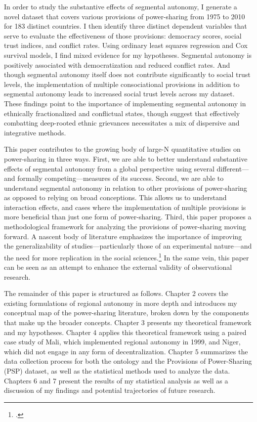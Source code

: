 \documentclass[12pt]{article}
\begin{document}
In order to study the substantive effects of segmental autonomy, I generate a novel dataset that covers various provisions of power-sharing from 1975 to 2010 for 183 distinct countries. I then identify three distinct dependent variables that serve to evaluate the effectiveness of those provisions: democracy scores, social trust indices, and conflict rates. Using ordinary least squares regression and Cox survival models, I find mixed evidence for my hypotheses. Segmental autonomy is positively associated with democratization and reduced conflict rates. And though segmental autonomy itself does not contribute significantly to social trust levels, the implementation of multiple consociational provisions in addition to segmental autonomy leads to increased social trust levels across my dataset. These findings point to the importance of implementing segmental autonomy in ethnically fractionalized and conflictual states, though suggest that effectively combatting deep-rooted ethnic grievances necessitates a mix of dispersive and integrative methods.
 
This paper contributes to the growing body of large-N quantitative studies on power-sharing in three ways. First, we are able to better understand substantive effects of segmental autonomy from a global perspective using several different---and formally competing---measures of its success. Second, we are able to understand segmental autonomy in relation to other provisions of power-sharing as opposed to relying on broad conceptions. This allows us to understand interaction effects, and cases where the implementation of multiple provisions is more beneficial than just one form of power-sharing. Third, this paper proposes a methodological framework for analyzing the provisions of power-sharing moving forward. A nascent body of literature emphasizes the importance of improving the generalizability of studies---particularly those of an experimental nature---and the need for more replication in the social sciences.\footcite{dunning_information_2020, dunning_replicate_2014} In the same vein, this paper can be seen as an attempt to enhance the external validity of observational research. 

The remainder of this paper is structured as follows. Chapter 2 covers the existing formulations of regional autonomy in more depth and introduces my conceptual map of the power-sharing literature, broken down by the components that make up the broader concepts. Chapter 3 presents my theoretical framework and my hypotheses. Chapter 4 applies this theoretical framework using a paired case study of Mali, which implemented regional autonomy in 1999, and Niger, which did not engage in any form of decentralization. Chapter 5 summarizes the data collection process for both the ontology and the Provisions of Power-Sharing (PSP) dataset, as well as the statistical methods used to analyze the data. Chapters 6 and 7 present the results of my statistical analysis as well as a discussion of my findings and potential trajectories of future research. 
\end{document}
